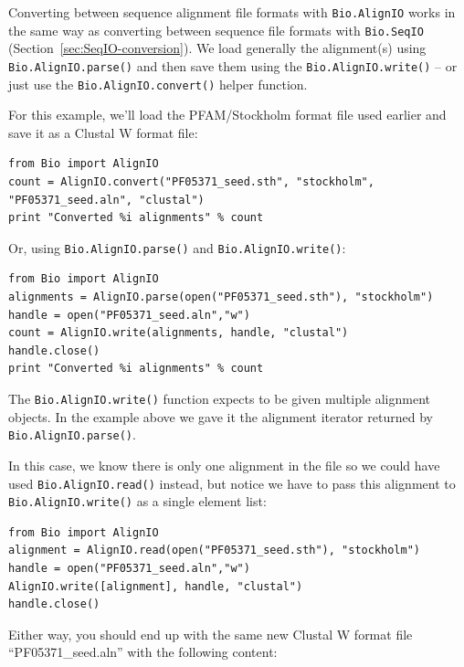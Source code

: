 \documentclass{report}
\begin{document}
Converting between sequence alignment file formats with \verb|Bio.AlignIO| works
in the same way as converting between sequence file formats with \verb|Bio.SeqIO|
(Section~\ref{sec:SeqIO-conversion}). We load generally the alignment(s) using
\verb|Bio.AlignIO.parse()| and then save them using the \verb|Bio.AlignIO.write()|
-- or just use the \verb|Bio.AlignIO.convert()| helper function.

For this example, we'll load the PFAM/Stockholm format file used earlier and save it as a Clustal W format file:

\begin{verbatim}
from Bio import AlignIO
count = AlignIO.convert("PF05371_seed.sth", "stockholm", "PF05371_seed.aln", "clustal")
print "Converted %i alignments" % count
\end{verbatim}

Or, using \verb|Bio.AlignIO.parse()| and \verb|Bio.AlignIO.write()|:

\begin{verbatim}
from Bio import AlignIO
alignments = AlignIO.parse(open("PF05371_seed.sth"), "stockholm")
handle = open("PF05371_seed.aln","w")
count = AlignIO.write(alignments, handle, "clustal")
handle.close()
print "Converted %i alignments" % count
\end{verbatim}

The \verb|Bio.AlignIO.write()| function expects to be given multiple alignment objects.  In the example above we gave it the alignment iterator returned by \verb|Bio.AlignIO.parse()|.

In this case, we know there is only one alignment in the file so we could have used \verb|Bio.AlignIO.read()| instead, but notice we have to pass this alignment to \verb|Bio.AlignIO.write()| as a single element list:

\begin{verbatim}
from Bio import AlignIO
alignment = AlignIO.read(open("PF05371_seed.sth"), "stockholm")
handle = open("PF05371_seed.aln","w")
AlignIO.write([alignment], handle, "clustal")
handle.close()
\end{verbatim}

Either way, you should end up with the same new Clustal W format file ``PF05371\_seed.aln'' with the following content:
\end{document}
